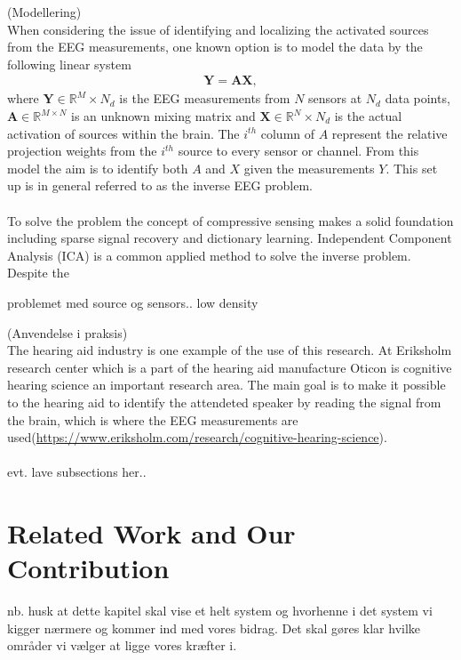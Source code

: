 (Modellering)\\
When considering the issue of identifying and localizing the activated sources from the EEG measurements, one known option is to model the data by the following linear system 
\begin{align*}
\mathbf{Y} = \mathbf{AX},
\end{align*}
where $\mathbf{Y} \in \mathbb{R}^M\times N_d$ is the EEG measurements from $N$ sensors at $N_d$ data points, $\mathbf{A} \in \mathbb{R}^{M \times N}$ is an unknown mixing matrix and $\mathbf{X} \in \mathbb{R}^N \times N_d$ is the actual activation of sources within the brain. The $i^{th}$ column of $A$ represent the relative projection weights from the $i^{th}$ source to every sensor or channel\cite{phd2015}. 
From this model the aim is to identify both $A$ and $X$ given the measurements $Y$. This set up is in general referred to as the inverse EEG problem.  \\
\\
To solve the problem the concept of compressive sensing makes a solid foundation including sparse signal recovery and dictionary learning. Independent Component Analysis (ICA) is a common applied method to solve the inverse problem\cite{Scott1996}\cite{Scott1997}. \\
Despite the      




problemet med source og sensors.. 
low density 

(Anvendelse i praksis)\\
The hearing aid industry is one example of the use of this research. At Eriksholm research center which is a part of the hearing aid manufacture Oticon is cognitive hearing science an important research area. The main goal is to make it possible to the hearing aid to identify the attendeted speaker by reading the signal from the brain, which is where the EEG measurements are used(\url{https://www.eriksholm.com/research/cognitive-hearing-science}). \\
\\


evt. lave subsections her..

\section{Related Work and Our Contribution} 





nb. husk at dette kapitel skal vise et helt system og hvorhenne i det system vi kigger nærmere og kommer ind med vores bidrag. Det skal gøres klar hvilke områder vi vælger at ligge vores kræfter i.  





 
